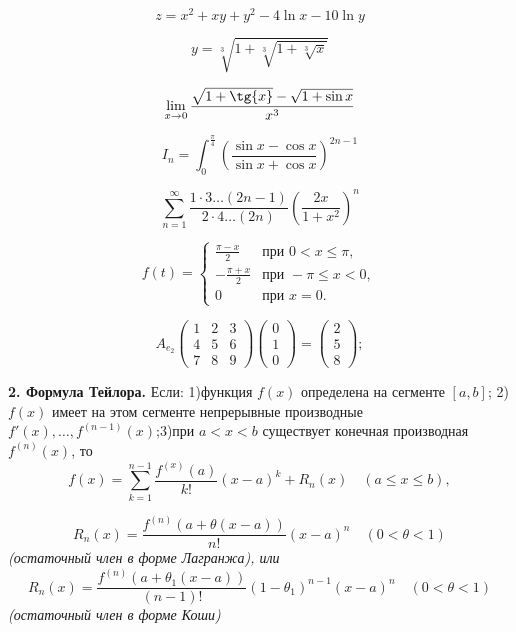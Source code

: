 \documentclass[a4paper, 12pt]{article}
\begin{document}
$$
z=x^2+xy+y^2-4\ln {x}-10\ln {y}
$$

$$
y=\sqrt[3]{1+\sqrt[3]{1+\sqrt[3]{x}}}
$$

$$
\lim_{x \to 0}\frac{\sqrt{1+\tg{x}}-\sqrt{1+\sin{x}}}{x^3}  
$$

$$
I_n= \int_{0}^{\frac{\pi}{4}} \left(\frac{\sin{x}-\cos{x}}{\sin{x}+\cos{x}}\right)^{2n-1}
$$

$$
\sum \limits_{n=1}^\infty \frac{1\cdot3\ldots(2n-1)}{2\cdot4\ldots(2n)}\left(\frac{2x}{1+x^2}\right)^n
$$

$$
f{(t)}=\begin{cases}
\frac{\pi-x}{2} & \text{при } 0 < x \leqslant \pi, \\
-\frac{\pi+x}{2} & \text{при } -\pi \leqslant x < 0,  \\
0 & \text{при } x=0.
\end{cases}
$$

$$
A_{e_2} \begin{pmatrix}
1 & 2 & 3 \\
4 & 5 & 6 \\
7 & 8 & 9
\end{pmatrix}\begin{pmatrix}
0 \\
1 \\
0
\end{pmatrix}=\begin{pmatrix}
2 \\
5 \\
8
\end{pmatrix};
$$

\textbf{2. Формула Тейлора.} Если: 1)функция $f(x)$ определена на сегменте $[a,b]$; 2)$f(x)$ имеет на этом сегменте непрерывные производные $f'(x), \ldots, f^{(n-1)}(x)$;3)при $a<x<b$ существует конечная производная $f^{(n)}(x)$, то 
$$
f(x) = \sum \limits_{k=1}^{n-1} \frac{f^{(x)}(a)}{k!}\left(x-a\right)^k+R_n(x) \quad (a \leqslant x \leqslant b),
$$

$$
R_n(x)= \frac{f^{(n)}\left(a+\theta \left(x-a\right)\right)}{n!}\left(x-a\right)^n \quad (0<\theta<1)
$$
\it{(остаточный член в форме Лагранжа), или}\rm
$$
R_n(x)= \frac{f^{(n)}\left(a+\theta_1 \left(x-a\right)\right)}{(n-1)!}\left(1-\theta_1\right)^{n-1}\left(x-a\right)^n \quad (0<\theta<1)
$$
\it{(остаточный член в форме Коши)}\rm
\end{document}
